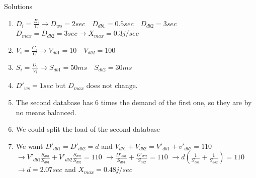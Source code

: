 \documentclass[handout]{beamer}
\begin{document}
\begin{frame}{Solutions}
\begin{enumerate}
\item $D_i = \frac{B_i}{C} \rightarrow D_{ws} = 2sec \quad D_{db1} = 0.5 sec \quad D_{db2} = 3 sec$
$D_{max} = D_{db2} = 3 sec \rightarrow X_{max} = 0.3j/sec$

\item $V_i = \frac{C_i}{C} \rightarrow V_{db1} = 10 \quad V_{db2} = 100$

\item $S_i = \frac{D_i}{V_i} \rightarrow S_{db1} = 50ms \quad S_{db2} = 30ms$

\item $D'_{ws} = 1 sec$ but $D_{max}$ does not change.

\item The second database has 6 times the demand of the first one, so they are by no means balanced.

\item We could split the load of the second database

\item We want $D'_{db1} = D'_{db2} = d$ and $V_{db1} + V_{db2} = V'_{db1} + v'_{db2} = 110$
$\rightarrow V'_{db1} \frac{S_{db1}}{S_{db1}} + V'_{db2} \frac{S_{db2}}{S_{db2}} = 110$
$\rightarrow \frac{D'_{db1}}{S_{db1}} + \frac{D'_{db2}}{S_{db2}} = 110$
$\rightarrow d (\frac{1}{S_{db1}} + \frac{1}{S_{db2}})  = 110$
$\rightarrow d = 2.07 sec$ and $X_{max} = 0.48j/sec$
\end{enumerate}
\end{frame}
\end{document}
